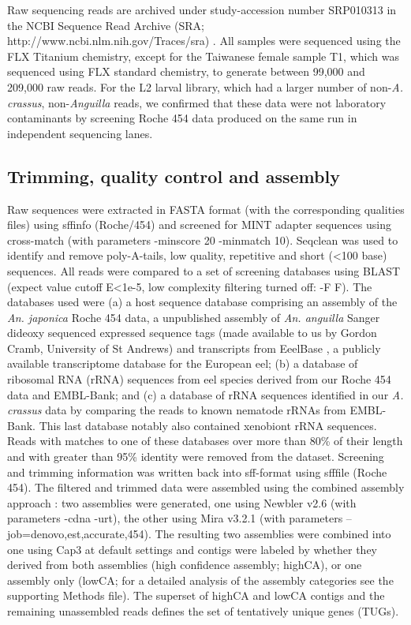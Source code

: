\documentclass[10pt]{bmc_article}
\newenvironment{bmcformat}{\begin{raggedright}\baselineskip20pt\sloppy\setboolean{publ}{false}}{\end{raggedright}\baselineskip20pt\sloppy}
\begin{document}
\begin{bmcformat}
Raw sequencing reads are archived under study-accession number
SRP010313 in the NCBI Sequence Read Archive (SRA;
http://www.ncbi.nlm.nih.gov/Traces/sra) \cite{pmid22140104}. All
samples were sequenced using the FLX Titanium chemistry, except for
the Taiwanese female sample T1, which was sequenced using FLX standard
chemistry, to generate between 99,000 and 209,000 raw reads. For the
L2 larval library, which had a larger number of
non-\textit{A. crassus}, non-\textit{Anguilla} reads, we confirmed
that these data were not laboratory contaminants by screening Roche
454 data produced on the same run in independent sequencing lanes.

\subsection*{Trimming, quality control and assembly}

Raw sequences were extracted in FASTA format (with the corresponding
qualities files) using sffinfo (Roche/454) and screened for MINT
adapter sequences using cross-match \cite{PHRAP} (with parameters
-minscore 20 -minmatch 10). Seqclean \cite{tgicl_pertea} was used to
identify and remove poly-A-tails, low quality, repetitive and short
(<100 base) sequences. All reads were compared to a set of screening
databases using BLAST (expect value cutoff E<1e-5, low complexity
filtering turned off: -F F). The databases used were (a) a host
sequence database comprising an assembly of the \textit{An. japonica}
Roche 454 data, a unpublished assembly of \textit{An. anguilla} Sanger
dideoxy sequenced expressed sequence tags (made available to us by
Gordon Cramb, University of St Andrews) and transcripts from EeelBase
\cite{pmid21080939}, a publicly available transcriptome database for
the European eel; (b) a database of ribosomal RNA (rRNA) sequences
from eel species derived from our Roche 454 data and EMBL-Bank; and
(c) a database of rRNA sequences identified in our \textit{A. crassus}
data by comparing the reads to known nematode rRNAs from
EMBL-Bank. This last database notably also contained xenobiont rRNA
sequences. Reads with matches to one of these databases over more than
80\% of their length and with greater than 95\% identity were removed
from the dataset. Screening and trimming information was written back
into sff-format using sfffile (Roche 454). The filtered and trimmed
data were assembled using the combined assembly approach
\cite{pmid20950480}: two assemblies were generated, one using Newbler
v2.6 \cite{pmid16056220} (with parameters -cdna -urt), the other using
Mira v3.2.1 \cite{miraEST} (with parameters
--job=denovo,est,accurate,454). The resulting two assemblies were
combined into one using Cap3 \cite{Cap3_Huang} at default settings and
contigs were labeled by whether they derived from both assemblies
(high confidence assembly; highCA), or one assembly only (lowCA; for a
detailed analysis of the assembly categories see the supporting
Methods file). The superset of highCA and lowCA contigs and the
remaining unassembled reads defines the set of tentatively unique
genes (TUGs).


\end{bmcformat}
\end{document}
